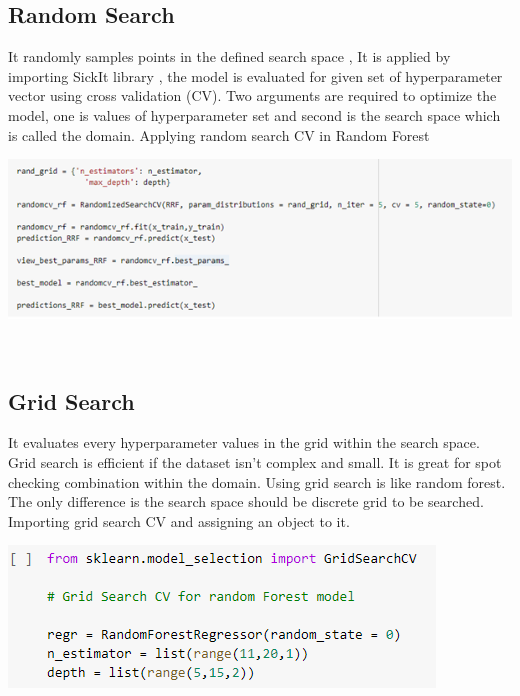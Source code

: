 \documentclass[journal,twoside,web]{ieeecolor}
\begin{document}
\subsection{Random Search}
It randomly samples points in the defined search space , It is applied by importing SickIt library , the model is evaluated for given set of hyperparameter vector using cross validation (CV). Two arguments are required to optimize the model, one is values of hyperparameter set and second is the search space which is called the domain. Applying random search CV in Random Forest
\\
\begin{center}
\includegraphics[scale=0.60]{Picture23.png}
\end{center}
\\
\subsection{Grid Search}
It evaluates every hyperparameter values in the grid within the search space. Grid search is efficient if the dataset isn’t complex and small. It is great for spot checking combination within the domain. Using grid search is like random forest. The only difference is the search space should be discrete grid to be searched. Importing grid search CV and assigning an object to it.
\\
\begin{center}
\includegraphics[scale=0.60]{Picture24.png}
\end{center}
\\
\\
\end{document}
